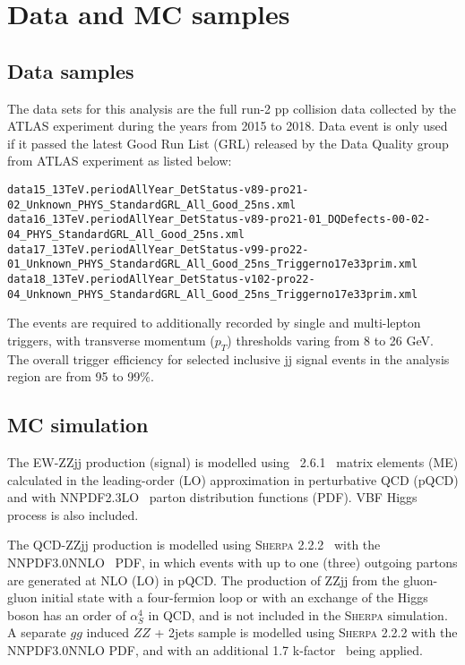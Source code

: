 \section{Data and MC samples}

\subsection{Data samples}

The data sets for this analysis are the full run-2 pp collision data collected by the ATLAS experiment during the years from 2015 to 2018.
Data event is only used if it passed the latest Good Run List (GRL) released by the Data Quality group from ATLAS experiment as listed below:


{\tiny
\begin{verbatim}
data15_13TeV.periodAllYear_DetStatus-v89-pro21-02_Unknown_PHYS_StandardGRL_All_Good_25ns.xml
data16_13TeV.periodAllYear_DetStatus-v89-pro21-01_DQDefects-00-02-04_PHYS_StandardGRL_All_Good_25ns.xml
data17_13TeV.periodAllYear_DetStatus-v99-pro22-01_Unknown_PHYS_StandardGRL_All_Good_25ns_Triggerno17e33prim.xml
data18_13TeV.periodAllYear_DetStatus-v102-pro22-04_Unknown_PHYS_StandardGRL_All_Good_25ns_Triggerno17e33prim.xml
\end{verbatim}
}

The events are required to additionally recorded by single and multi-lepton triggers, with transverse momentum ($p_{T}$) thresholds varing from 8 to 26 GeV.
The overall trigger efficiency for selected inclusive \llll jj signal events in the analysis region are from 95 to 99\%.

\subsection{MC simulation}

The EW-ZZjj production (signal) is modelled using \MGMCatNLO~2.6.1~\cite{Alwall:2014hca} matrix elements (ME) calculated in the leading-order (LO) approximation
in perturbative QCD (pQCD) and with NNPDF2.3LO~\cite{Ball:2012cx} parton distribution functions (PDF).
VBF Higgs process is also included.

The QCD-ZZjj production is modelled using \textsc{Sherpa} 2.2.2~\cite{Gleisberg:2008ta} with the NNPDF3.0NNLO~\cite{ball2015parton} PDF,
in which events with up to one (three) outgoing partons are generated at NLO (LO) in pQCD.
The production of ZZjj from the gluon-gluon initial state with a four-fermion loop or with an exchange of the Higgs boson has an order of $\alpha_{S}^{4}$ in QCD,
and is not included in the \textsc{Sherpa} simulation.
A separate $gg$ induced $ZZ$ + 2jets sample is modelled using \textsc{Sherpa} 2.2.2 with the NNPDF3.0NNLO PDF,
and with an additional 1.7 k-factor~\cite{PhysRevD.92.094028} being applied.

